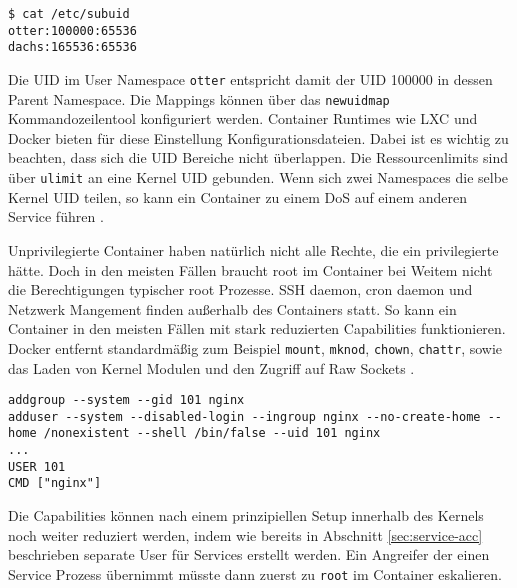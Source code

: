 \begin{lstlisting}
$ cat /etc/subuid
otter:100000:65536
dachs:165536:65536
\end{lstlisting}

Die UID im User Namespace \texttt{otter} entspricht damit der UID 100000 in dessen Parent Namespace. Die Mappings können über das \texttt{newuidmap} Kommandozeilentool konfiguriert werden. Container Runtimes wie LXC und Docker bieten für diese Einstellung Konfigurationsdateien. Dabei ist es wichtig zu beachten, dass sich die UID Bereiche nicht überlappen. Die Ressourcenlimits sind über \texttt{ulimit} an eine Kernel UID gebunden. Wenn sich zwei Namespaces die selbe Kernel UID teilen,
so kann ein Container zu einem DoS auf einem anderen Service führen \cite{lxc-sec}.

Unprivilegierte Container haben natürlich nicht alle Rechte, die ein privilegierte hätte. Doch in den meisten Fällen braucht root im Container bei Weitem nicht die Berechtigungen typischer root Prozesse. SSH daemon, cron daemon und Netzwerk Mangement finden außerhalb des Containers statt. So kann ein Container in den meisten Fällen mit stark reduzierten Capabilities funktionieren. Docker entfernt standardmäßig zum Beispiel \texttt{mount}, \texttt{mknod}, \texttt{chown},
\texttt{chattr}, sowie das Laden von Kernel Modulen und den Zugriff auf Raw Sockets \cite{docker-sec}.

\begin{lstlisting}[caption={Ein Beispiel Dockerfile für einen NGINX Web Server der nicht als root im Container läuft}]
addgroup --system --gid 101 nginx 
adduser --system --disabled-login --ingroup nginx --no-create-home --home /nonexistent --shell /bin/false --uid 101 nginx
...
USER 101
CMD ["nginx"]
\end{lstlisting}

Die Capabilities können nach einem prinzipiellen Setup innerhalb des Kernels noch weiter reduziert werden, indem wie bereits in Abschnitt \ref{sec:service-acc} beschrieben separate User für Services erstellt werden. Ein Angreifer der einen Service Prozess übernimmt müsste dann zuerst  zu \texttt{root} im Container eskalieren.  

